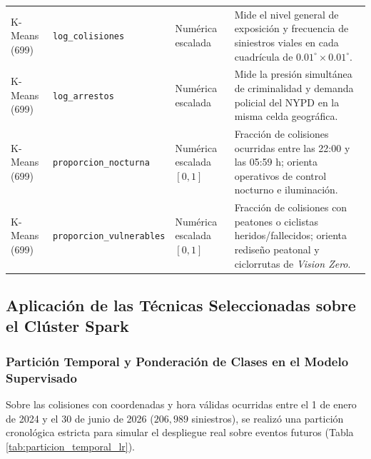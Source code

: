 \begin{table}[H]
\begin{tabularx}{\linewidth}{>{\raggedright\arraybackslash}p{2.2cm} >{\raggedright\arraybackslash}p{3.4cm} >{\raggedright\arraybackslash}p{3.0cm} X}
\midrule
K-Means (699) & \texttt{log\_colisiones} & Numérica escalada & Mide el nivel general de exposición y frecuencia de siniestros viales en cada cuadrícula de $0.01^\circ \times 0.01^\circ$. \\
K-Means (699) & \texttt{log\_arrestos} & Numérica escalada & Mide la presión simultánea de criminalidad y demanda policial del NYPD en la misma celda geográfica. \\
K-Means (699) & \texttt{proporcion\_nocturna} & Numérica escalada $[0,1]$ & Fracción de colisiones ocurridas entre las 22:00 y las 05:59 h; orienta operativos de control nocturno e iluminación. \\
K-Means (699) & \texttt{proporcion\_vulnerables} & Numérica escalada $[0,1]$ & Fracción de colisiones con peatones o ciclistas heridos/fallecidos; orienta rediseño peatonal y ciclorrutas de \textit{Vision Zero}. \\
\bottomrule
\end{tabularx}
\end{table}

\subsection{Aplicación de las Técnicas Seleccionadas sobre el Clúster Spark}
\label{subsec:aplicacion_mllib_num5}

\subsubsection{Partición Temporal y Ponderación de Clases en el Modelo Supervisado}

Sobre las colisiones con coordenadas y hora válidas ocurridas entre el 1 de enero de 2024 y el 30 de junio de 2026 ($206,989$ siniestros), se realizó una partición cronológica estricta para simular el despliegue real sobre eventos futuros (Tabla \ref{tab:particion_temporal_lr}).

\begin{table}[H]
\centering
\scriptsize
\renewcommand{\arraystretch}{1.2}
\caption{Partición temporal del conjunto de datos para el modelado supervisado en Spark MLlib.}
\label{tab:particion_temporal_lr}
\end{table}

